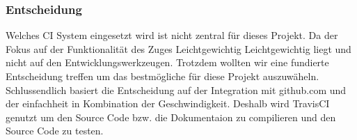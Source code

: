 \documentclass[../../../main.tex]{subfiles}
\begin{document}
\subsubsection{Entscheidung}
Welches CI System eingesetzt wird ist nicht zentral für dieses Projekt. Da der Fokus auf der Funktionalität des Zuges Leichtgewichtig Leichtgewichtig
liegt und nicht auf den Entwicklungswerkzeugen. Trotzdem wollten wir eine fundierte Entscheidung treffen um das bestmögliche für diese Projekt auszuwäheln.
Schlussendlich basiert die Entscheidung auf der Integration mit github.com und der einfachheit in Kombination der Geschwindigkeit.
Deshalb wird TravisCI genutzt um den Source Code bzw. die Dokumentaion zu compilieren und den Source Code zu testen.
\end{document}
